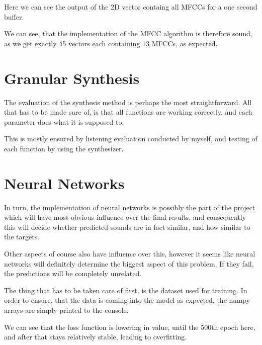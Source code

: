 Here we can see the output of the 2D vector containg all MFCCs for a
one second buffer.

We can see, that the implementation of the MFCC algorithm is therefore
sound, as we get exactly 45 vectors each containing 13 MFCCs, as expected. 

\section{Granular Synthesis}
The evaluation of the synthesis method is perhaps the most
straightforward. All that has to be made sure of, is that all
functions are working correctly, and each parameter does what it is
supposed to.

This is mostly ensured by listening evaluation conducted by myself,
and testing of each function by using the synthesizer.



\section{Neural Networks}

In turn, the implementation of neural networks is possibly the part of
the project which will have most obvious influence over the final
results, and consequently this will decide whether predicted sounds
are in fact similar, and how similar to the targets.

Other aspects of course also have influence over this, however it
seems like neural networks will definitely determine the biggest
aspect of this problem. If they fail, the predictions will be
completely unrelated.


The thing that has to be taken care of first, is the dataset used for
training. In order to ensure, that the data is coming into the model
as expected, the numpy arrays are simply printed to the console.

We can see that the loss function is lowering in value, until the
500th epoch here, and after that stays relatively stable, leading to
overfitting. 


